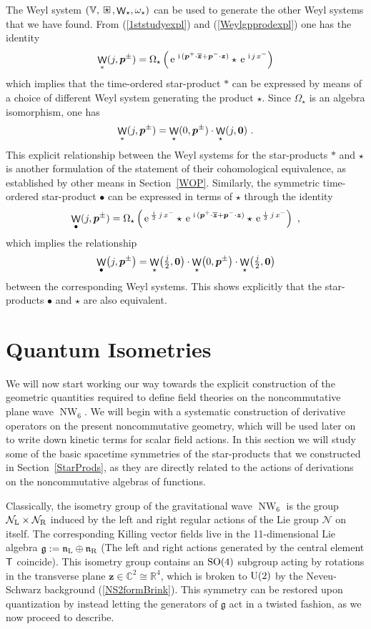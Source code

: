 \documentclass[11pt,a4paper]{article}
\DeclareMathOperator{\NW}{NW}
\DeclareMathOperator{\weyl}{{\sf W}}                   %
\newcommand{\compc}{\mkern+4mu\square\mkern-17.4mu{\mbox{
    \protect\raisebox{0.2ex}{$\star$}}\mkern+5mu}}      %
\newcommand{\mbf}[1]{{\boldsymbol {#1} }}
\def\ii{{\,{\rm i}\,}}
\def\T{{\sf T}}
\def\mz{{\mbf z}}
\def\mbp{{\mbf p}}
\def\mfn{{\mathfrak n}}
\def\mfg{{\mathfrak g}}
\def\mcN{{\mathcal N}}
\def\mbbV{{\mathbb V}}
\newcommand{\newsection}{\setcounter{equation}{0}\section}
\newcommand{\complex}{{\mathbb C}} %
\newcommand{\real}{{\mathbb R}} %
\def\e{{\,\rm e}\,}
\newcommand{\beq}{\begin{eqnarray}}
\newcommand{\eeq}{\end{eqnarray}}
\begin{document}
The Weyl system $(\mbbV,\compc,\weyl_\star,\omega_\star)$ can be used
to generate the other Weyl systems that we have found. From
(\ref{1ststudyexpl}) and (\ref{Weylgpprodexpl}) one has the identity
\beq
\weyl_*(j,\mbp^\pm)=\Omega_\star\left(
\e^{\ii(\mbf p^+\cdot\overline{\mz}
+\mbp^-\cdot\mz)}\star\e^{\ii j\, x^-}\right)
\label{weylTOWeylDelta}\eeq
which implies
that the time-ordered star-product $*$ can be expressed
by means of a choice of different Weyl system generating the product
$\star$. Since $\Omega_\star$ is an algebra isomorphism, one has
\beq
\weyl_*(j,\mbp^\pm)=\weyl_\star(0,\mbp^\pm)
\cdot\weyl_\star(j,\mbf0) \ .
\label{weylTOWeylprods}\eeq
This explicit relationship between the Weyl systems for the
star-products $*$ and $\star$ is another formulation of the statement
of their cohomological equivalence, as established by other means in
Section~\ref{WOP}. Similarly, the symmetric time-ordered star-product
$\bullet$ can be expressed in terms of $\star$ through the identity
\beq
\weyl_\bullet(j,\mbp^\pm)=\Omega_\star\left(
\e^{\frac\ii2\,j\,x^-}\star\e^{\ii(\mbp^+\cdot\overline{\mz}
+\mbp^-\cdot\mz)}\star\e^{\frac\ii2\,j\,x^-}\right) \ ,
\label{WeylTOsymWeylDelta}\eeq
which implies the relationship
\beq
\weyl_\bullet\bigl(j,\mbp^\pm\bigr)=\weyl_\star
\bigl(\mbox{$\frac j2$}
,\mbf0\bigr)\cdot\weyl_\star\bigl(0,\mbp^\pm\bigr)
\cdot\weyl_\star\bigl(\mbox{$\frac j2$},\mbf0\bigr)
\label{WeylTOsymWeylprods}\eeq
between the corresponding Weyl systems. This shows explicitly that the
star-products $\bullet$ and $\star$ are also equivalent.

\newsection{Quantum Isometries\label{Coprod}}

We will now start working our way towards the explicit construction of
the geometric quantities required to define field
theories on the noncommutative plane wave $\NW_6$. We will begin with
a systematic construction of derivative operators on the present
noncommutative geometry, which will be used later on to write down
kinetic terms for scalar field actions. In this section we will study
some of the basic spacetime symmetries of the star-products that we
constructed in Section~\ref{StarProds}, as they are directly related
to the actions of derivations on the noncommutative algebras of
functions.

Classically, the isometry group of the gravitational wave $\NW_6$ is
the group $\mcN_{\rm L}\times\mcN_{\rm R}$ induced by the left and right
regular actions of the Lie group $\mcN$ on itself. The corresponding Killing
vector fields live in the 11-dimensional Lie algebra $\mfg:=\mfn_{\rm
  L}\oplus\mfn_{\rm R}$ (The left and right actions generated by the
central element $\T$ coincide). This isometry group contains an ${\rm
  SO}(4)$ subgroup acting by rotations in the transverse plane
$\mz\in\complex^2\cong\real^4$, which is broken to ${\rm U}(2)$ by the
Neveu-Schwarz background (\ref{NS2formBrink}). This symmetry can be
restored upon quantization by instead letting the generators of $\mfg$
act in a twisted fashion, as we now proceed to describe.
\end{document}
